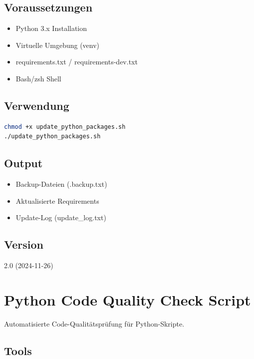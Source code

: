 \documentclass{vorlage-design-main}
\begin{document}
\subsection{Voraussetzungen}\label{voraussetzungen-1}

\begin{itemize}

\item
  Python 3.x Installation
\item
  Virtuelle Umgebung (venv)
\item
  requirements.txt / requirements-dev.txt
\item
  Bash/zsh Shell
\end{itemize}

\subsection{Verwendung}\label{verwendung-1}

\begin{lstlisting}[language=bash]
chmod +x update_python_packages.sh
./update_python_packages.sh
\end{lstlisting}

\subsection{Output}\label{output}

\begin{itemize}

\item
  Backup-Dateien (.backup.txt)
\item
  Aktualisierte Requirements
\item
  Update-Log (update\_log.txt)
\end{itemize}

\subsection{Version}\label{version}

2.0 (2024-11-26)

\section{Python Code Quality Check
Script}\label{python-code-quality-check-script}

Automatisierte Code-Qualitätsprüfung für Python-Skripte.

\subsection{Tools}\label{tools-1}
\end{document}
